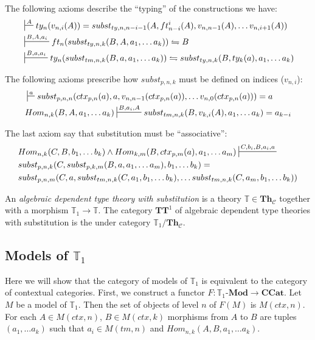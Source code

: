 \documentclass[reqno]{amsart}
\theoremstyle{definition}
\theoremstyle{remark}
\newcommand{\cat}[1]{\mathbf{#1}}
\newcommand{\ccat}{\cat{CCat}}
\newcommand{\algtt}{\cat{TT}}
\newcommand{\Mod}[1]{#1\text{-}\cat{Mod}}
\newcommand{\Th}{\cat{Th}}
\newcommand{\ThC}{\Th_{\mathcal{C}}}
\numberwithin{figure}{section}
\begin{document}
The following axioms describe the ``typing'' of the constructions we have:
\begin{align}
\label{ax:type-var}
& \sststile{}{A}         ty_n(v_{n,i}(A)) = subst_{ty,n,n-i-1}(A, ft^i_{n-i}(A), v_{n,n-1}(A), \ldots v_{n,i+1}(A)) \\
\label{ax:type-subst-ty}
& \sststile{}{B, A, a_i} ft_n(subst_{ty,n,k}(B, A, a_1, \ldots a_k)) \leftrightharpoons B \\
\label{ax:type-subst-tm}
& \sststile{}{B, a, a_i} ty_n(subst_{tm,n,k}(B, a, a_1, \ldots a_k)) \leftrightharpoons subst_{ty,n,k}(B, ty_k(a), a_1, \ldots a_k)
\end{align}

The following axioms prescribe how $subst_{p,n,k}$ must be defined on indices ($v_{n,i}$):
\begin{align}
\label{ax:subst-var}
& \sststile{}{a}         subst_{p,n,n}(ctx_{p,n}(a), a, v_{n,n-1}(ctx_{p,n}(a)), \ldots v_{n,0}(ctx_{p,n}(a))) = a \\
\label{ax:var-subst}
& Hom_{n,k}(B, A, a_1, \ldots a_k) \sststile{}{B, a_i, A} subst_{tm,n,k}(B, v_{k,i}(A), a_1, \ldots a_k) = a_{k-i}
\end{align}

The last axiom say that substitution must be ``associative'':
\begin{align}
\label{ax:subst-subst}
& Hom_{n,k}(C, B, b_1, \ldots b_k) \land Hom_{k,m}(B, ctx_{p,m}(a), a_1, \ldots a_m) \sststile{}{C, b_i, B, a_i, a} \\ \notag
& subst_{p,n,k}(C, subst_{p,k,m}(B, a, a_1, \ldots a_m), b_1, \ldots b_k) = \\ \notag
& subst_{p,n,m}(C, a, subst_{tm,n,k}(C, a_1, b_1, \ldots b_k), \ldots subst_{tm,n,k}(C, a_m, b_1, \ldots b_k))
\end{align}

\begin{defn}
An \emph{algebraic dependent type theory with substitution} is a theory $\mathbb{T} \in \ThC$ together with a morphism $\mathbb{T}_1 \to \mathbb{T}$.
The category $\algtt^1$ of algebraic dependent type theories with substitution is the under category $\mathbb{T}_1/\ThC$.
\end{defn}

\subsection{Models of $\mathbb{T}_1$}

Here we will show that the category of models of $\mathbb{T}_1$ is equivalent to the category of contextual categories.
First, we construct a functor $F : \Mod{\mathbb{T}_1} \to \ccat$.
Let $M$ be a model of $\mathbb{T}_1$.
Then the set of objects of level $n$ of $F(M)$ is $M(ctx,n)$.
For each $A \in M(ctx,n)$, $B \in M(ctx,k)$ morphisms from $A$ to $B$ are tuples $(a_1, \ldots a_k)$ such that $a_i \in M(tm,n)$ and $Hom_{n,k}(A, B, a_1, \ldots a_k)$.
\end{document}
